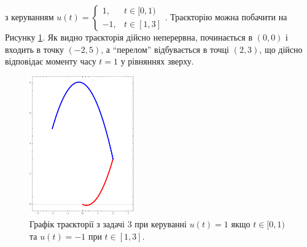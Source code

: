 \documentclass[oneside,solution]{karazin-control-assign}
\begin{document}
з керуванням $u(t) = \begin{cases}
    1, & t \in [0,1) \\
    -1, & t \in [1,3]
\end{cases}$. Траєкторію можна побачити на Рисунку \ref{fig:problem-3}. Як видно траєкторія дійсно неперервна, починається в $(0,0)$ і входить в точку $(-2,5)$, а ``перелом'' відбувається в точці $(2,3)$, що дійсно відповідає моменту часу $t=1$ у рівняннях зверху.

\begin{figure}
    \centering
    \includegraphics[width=0.4\textwidth]{figure.pdf}
    \caption{Графік траєкторії з задачі 3 при керуванні $u(t)=1$ якщо $t \in [0,1)$ та $u(t)=-1$ при $t \in [1,3]$.}
    \label{fig:problem-3}
\end{figure}
\end{document}
